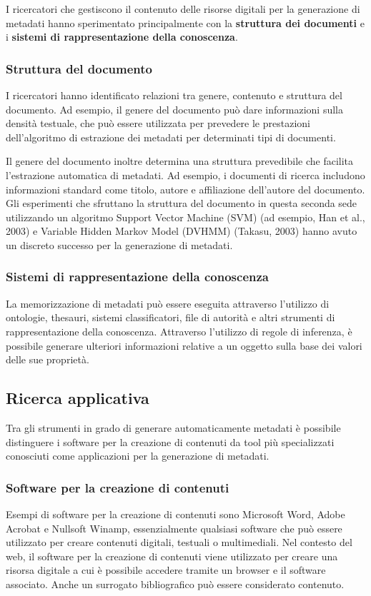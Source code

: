 I ricercatori che gestiscono il contenuto delle risorse digitali per la generazione di metadati hanno sperimentato principalmente con la \textbf{struttura dei documenti} e i \textbf{sistemi di rappresentazione della conoscenza}.

\subsubsection{Struttura del documento}
I ricercatori hanno identificato relazioni tra genere, contenuto e struttura del documento. Ad esempio, il genere del documento può dare informazioni sulla densità testuale, che può essere utilizzata per prevedere le prestazioni dell'algoritmo di estrazione dei metadati per determinati tipi di documenti.

Il genere del documento inoltre determina una struttura prevedibile che facilita l'estrazione automatica di metadati. Ad esempio, i documenti di ricerca includono informazioni standard come titolo, autore e affiliazione dell'autore del documento. Gli esperimenti che sfruttano la struttura del documento in questa seconda sede utilizzando un algoritmo Support Vector Machine (SVM) (ad esempio, Han et al., 2003) e Variable Hidden Markov Model (DVHMM) (Takasu, 2003) hanno avuto un discreto successo per la generazione di metadati.

\subsubsection{Sistemi di rappresentazione della conoscenza}
La memorizzazione di metadati può essere eseguita attraverso l'utilizzo di ontologie, thesauri, sistemi classificatori, file di autorità e altri strumenti di rappresentazione della conoscenza.
Attraverso l'utilizzo di regole di inferenza, è possibile generare ulteriori informazioni relative a un oggetto sulla base dei valori delle sue proprietà.

\subsection{Ricerca applicativa}
Tra gli strumenti in grado di generare automaticamente metadati è possibile distinguere i software per la creazione di contenuti da tool più specializzati conosciuti come applicazioni per la generazione di metadati.

\subsubsection{Software per la creazione di contenuti}
Esempi di software per la creazione di contenuti sono Microsoft Word, Adobe Acrobat e Nullsoft Winamp, essenzialmente qualsiasi software che può essere utilizzato per creare contenuti digitali, testuali o multimediali. Nel contesto del web, il software per la creazione di contenuti viene utilizzato per creare una risorsa digitale a cui è possibile accedere tramite un browser e il software associato. Anche un surrogato bibliografico può essere considerato contenuto.

